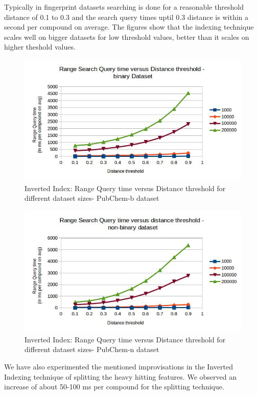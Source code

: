 Typically in fingerprint datasets searching is done for a reasonable threshold distance of 0.1 to 0.3 and the search query times uptil 0.3 distance is within a second per compound on average. The figures show that the indexing technique scales well on bigger datasets for low threshold values, better than it scales on higher theshold values.


\begin{figure}[ht]	
\centering
\includegraphics[width=1 \columnwidth]{img/imageI2.jpg}
\caption{Inverted Index: Range Query time versus Distance threshold for different dataset sizes- PubChem-b dataset}
\label{fig:5I2}
\end{figure}

\begin{figure}[ht!]	
\centering
\includegraphics[width=1 \columnwidth]{img/imageI3.jpg}
\caption{Inverted Index: Range Query time versus Distance threshold for different dataset sizes- PubChem-n dataset}
\label{fig:5I3}
\end{figure}


We have also experimented the mentioned improvisations in the Inverted Indexing technique of splitting the heavy hitting features. We observed an increase of about 50-100 ms per compound for the splitting technique.



